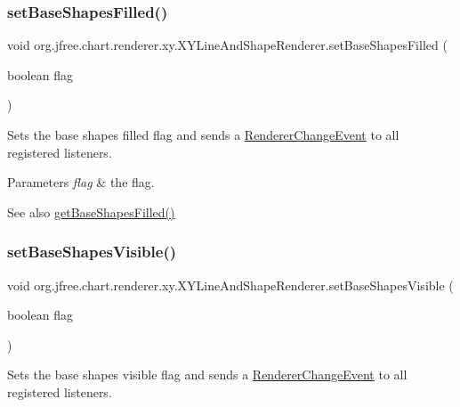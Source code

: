 \subsubsection{\texorpdfstring{set\+Base\+Shapes\+Filled()}{setBaseShapesFilled()}}
{\footnotesize\ttfamily void org.\+jfree.\+chart.\+renderer.\+xy.\+X\+Y\+Line\+And\+Shape\+Renderer.\+set\+Base\+Shapes\+Filled (\begin{DoxyParamCaption}\item[{boolean}]{flag }\end{DoxyParamCaption})}

Sets the base \textquotesingle{}shapes filled\textquotesingle{} flag and sends a \mbox{\hyperlink{}{Renderer\+Change\+Event}} to all registered listeners.


\begin{DoxyParams}{Parameters}
{\em flag} & the flag.\\
\hline
\end{DoxyParams}
\begin{DoxySeeAlso}{See also}
\mbox{\hyperlink{classorg_1_1jfree_1_1chart_1_1renderer_1_1xy_1_1_x_y_line_and_shape_renderer_a82f6abe4e086c2e8740b11f5bab8c722}{get\+Base\+Shapes\+Filled()}} 
\end{DoxySeeAlso}
\mbox{\label{classorg_1_1jfree_1_1chart_1_1renderer_1_1xy_1_1_x_y_line_and_shape_renderer_a7bac4d3610108bc67054f37198ad7133}} 
\subsubsection{\texorpdfstring{set\+Base\+Shapes\+Visible()}{setBaseShapesVisible()}}
{\footnotesize\ttfamily void org.\+jfree.\+chart.\+renderer.\+xy.\+X\+Y\+Line\+And\+Shape\+Renderer.\+set\+Base\+Shapes\+Visible (\begin{DoxyParamCaption}\item[{boolean}]{flag }\end{DoxyParamCaption})}

Sets the base \textquotesingle{}shapes visible\textquotesingle{} flag and sends a \mbox{\hyperlink{}{Renderer\+Change\+Event}} to all registered listeners.


